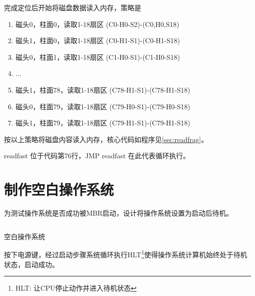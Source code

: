 完成定位后开始将磁盘数据读入内存，策略是
\begin{enumerate}
\item 磁头0，柱面0，读取1-18扇区 (C0-H0-S2)-(C0,H0,S18)
\item 磁头1，柱面0，读取1-18扇区 (C0-H1-S1)-(C0-H1-S18)
\item 磁头0，柱面1，读取1-18扇区 (C1-H0-S1)-(C1-H0-S18)
\item ...
\item 磁头1，柱面78，读取1-18扇区 (C78-H1-S1)-(C78-H1-S18)
\item 磁头0，柱面79，读取1-18扇区 (C79-H0-S1)-(C79-H0-S18)
\item 磁头1，柱面79，读取1-18扇区 (C79-H1-S1)-(C79-H1-S18)
\end{enumerate}

按以上策略将磁盘内容读入内存，核心代码如程序见\ref{sec:readfrag}。

readfast 位于代码第76行，JMP readfast 在此代表循环执行。

\section{制作空白操作系统}

为测试操作系统是否成功被MBR启动，设计将操作系统设置为启动后待机。


\begin{listing}[H]
  \inputminted[tabsize=2, firstline=1,
  linenos=true]{c}{fig/blankos.c}
  \caption{空白操作系统}
  \label{lst:blankos}
\end{listing}

按下电源键，经过启动步骤系统循环执行HLT\footnote{HLT: 让CPU停止动作并进入待机状态\cite{30_osKawaiHidemi200630}}使得操作系统计算机始终处于待机状态，启动成功。

